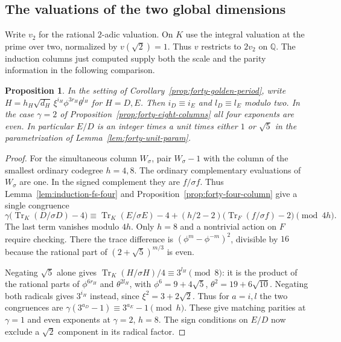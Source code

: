 \documentclass[11pt,reqno]{amsart}
\newtheorem{proposition}[theorem]{Proposition}
\theoremstyle{remark}\newtheorem{remark}[theorem]{Remark}
\numberwithin{equation}{section}
\begin{document}
\subsection{The valuations of the two global dimensions}
Write $v_2$ for the rational $2$-adic valuation. On $K$ use the integral
valuation at the prime over two, normalized by $v(\sqrt2)=1$.
Thus $v$ restricts to $2v_2$ on $\mathbb Q$. The induction columns just
computed supply both the scale and the parity information in the
following comparison.

\begin{proposition}\label{prop:forty-exponent-parity}
In the setting of Corollary~\ref{prop:forty-golden-period}, write
$H=h_H\sqrt{d_H}\,\xi^{i_H}\phi^{3r_H}\theta^{l_H}$ for $H=D,E$.
Then $i_D\equiv i_E$ and $l_D\equiv l_E$ modulo two.
In the case $\gamma=2$ of Proposition~\ref{prop:forty-eight-columns}
all four exponents are even.
In particular $E/D$ is an integer times a unit times either $1$ or
$\sqrt5$ in the parametrization of Lemma~\ref{lem:forty-unit-param}.
\end{proposition}
\begin{proof}
For the simultaneous column $W_\sigma$, pair $W_\sigma-1$ with the
column of the smallest ordinary codegree $h=4,8$. The ordinary complementary evaluations of $W_\sigma$
are one. In the signed complement they are $f/\sigma f$. Thus
Lemma~\ref{lem:induction-fs-four} and
Proposition~\ref{prop:forty-four-column} give a single congruence
\[
 \gamma\bigl(\operatorname{Tr}_K(D/\sigma D)-4\bigr)
 \equiv\operatorname{Tr}_K(E/\sigma E)-4
 +(h/2-2)\bigl(\operatorname{Tr}_F(f/\sigma f)-2\bigr)
 \pmod{4h}.
\]
The last term vanishes modulo $4h$. Only $h=8$ and a nontrivial
action on $F$ require checking. There the trace difference is
$(\phi^m-\phi^{-m})^2$, divisible by $16$ because the rational
part of $(2+\sqrt5)^{m/3}$ is even.

Negating $\sqrt5$ alone gives
$\operatorname{Tr}_K(H/\sigma H)/4\equiv3^{l_H}\pmod8$:
it is the product of the rational parts of $\phi^{6r_H}$ and
$\theta^{2l_H}$, with $\phi^6=9+4\sqrt5$, $\theta^2=19+6\sqrt{10}$.
Negating both radicals gives $3^{i_H}$ instead, since
$\xi^2=3+2\sqrt2$. Thus for $a=i,l$ the two congruences are
$\gamma(3^{a_D}-1)\equiv3^{a_E}-1\pmod h$. These give matching
parities at $\gamma=1$ and even exponents at $\gamma=2$, $h=8$.
The sign conditions on $E/D$ now exclude a $\sqrt2$ component in
its radical factor.
\end{proof}
\end{document}
